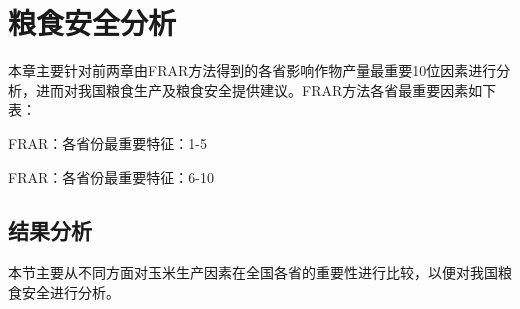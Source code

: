
\chapter{粮食安全分析}
本章主要针对前两章由FRAR方法得到的各省影响作物产量最重要10位因素进行分析，进而对我国粮食生产及粮食安全提供建议。FRAR方法各省最重要因素如下表：

\begin{table}[!htbp]
    \centering
    \caption{FRAR：各省份最重要特征：1-5}
    \label{table:Feature5_FRAR1}
    \resizebox{\textwidth}{!}
    {
    }
\end{table}
\setlength{\floatsep}{0pt}
\begin{table}[!htbp]
    \centering
    \caption{FRAR：各省份最重要特征：6-10}
    \label{table:Feature5_FRAR2}
    \resizebox{\textwidth}{!}
    {
    }
\end{table}

\section{结果分析}
本节主要从不同方面对玉米生产因素在全国各省的重要性进行比较，以便对我国粮食安全进行分析。

